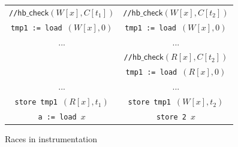 \documentclass[preprint, 9pt]{sigplanconf}
\newcommand{\load}[2]{#1\ \texttt{:= load}\ #2}
\newcommand{\store}[2]{\texttt{store}\ #2\ #1}
\begin{document}
\begin{figure}[htb]
\centering
\begin{tabular}{c || c}
\texttt{//}{$\mathsf{hb\_check}(W[x], C[t_1])$} & \texttt{//}$\mathsf{hb\_check}(W[x], C[t_2])$\\
\load{\texttt{tmp1}}{$(W[x], 0)$} & \load{\texttt{tmp1}}{$(W[x], 0)$}\\
... & ...\\
& \texttt{//}$\mathsf{hb\_check}(R[x], C[t_2])$\\
& \load{\texttt{tmp1}}{$(R[x], 0)$}\\
... & ...\\
\store{$(R[x], t_1)$}{\texttt{tmp1}} & \store{$(W[x], t_2)$}{\texttt{tmp1}}\\
\load{\texttt{a}}{$x$} & \store{$x$}{\texttt{2}}
\end{tabular}

\caption{Races in instrumentation}
\label{instr-race}
\end{figure}
\end{document}
